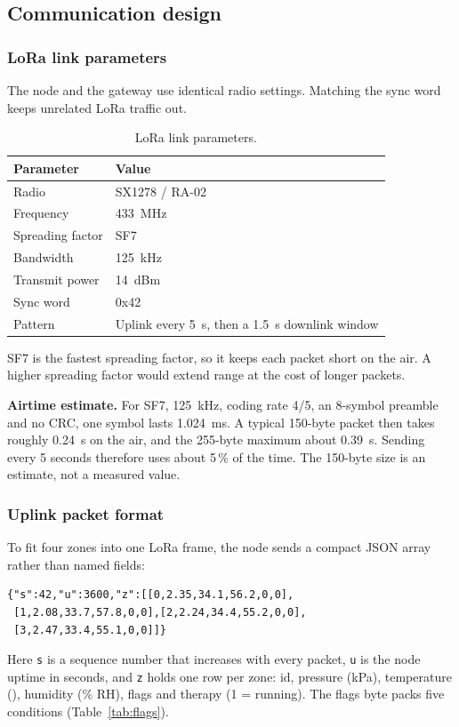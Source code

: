 \subsection{Communication design}
\subsubsection{LoRa link parameters}
The node and the gateway use identical radio settings. Matching the sync word keeps unrelated LoRa traffic out.

{\small{}
\begin{table}[H]
\centering
\begin{tabular}{@{}ll@{}}
\toprule
\textbf{Parameter} & \textbf{Value}\\
\midrule
Radio & SX1278 / RA-02\\
Frequency & 433~MHz\\
Spreading factor & SF7\\
Bandwidth & 125~kHz\\
Transmit power & 14~dBm\\
Sync word & 0x42\\
Pattern & Uplink every 5~s, then a 1.5~s downlink window\\
\bottomrule
\end{tabular}
\caption{LoRa link parameters.}
\end{table}}
SF7 is the fastest spreading factor, so it keeps each packet short on the air. A higher spreading factor would extend range at the cost of longer packets.

\textbf{Airtime estimate.} For SF7, 125~kHz, coding rate 4/5, an 8-symbol preamble and no CRC, one symbol lasts 1.024~ms. A typical 150-byte packet then takes roughly 0.24~s on the air, and the 255-byte maximum about 0.39~s. Sending every 5 seconds therefore uses about 5\,\% of the time. The 150-byte size is an estimate, not a measured value.

\subsubsection{Uplink packet format}
\label{sec:packet}
To fit four zones into one LoRa frame, the node sends a compact JSON array rather than named fields:
{\small
\begin{verbatim}
{"s":42,"u":3600,"z":[[0,2.35,34.1,56.2,0,0],
 [1,2.08,33.7,57.8,0,0],[2,2.24,34.4,55.2,0,0],
 [3,2.47,33.4,55.1,0,0]]}
\end{verbatim}}
Here \texttt{s} is a sequence number that increases with every packet, \texttt{u} is the node uptime in seconds, and \texttt{z} holds one row per zone: id, pressure (kPa), temperature (\degC), humidity (\% RH), flags and therapy (1 = running). The flags byte packs five conditions (Table~\ref{tab:flags}).

